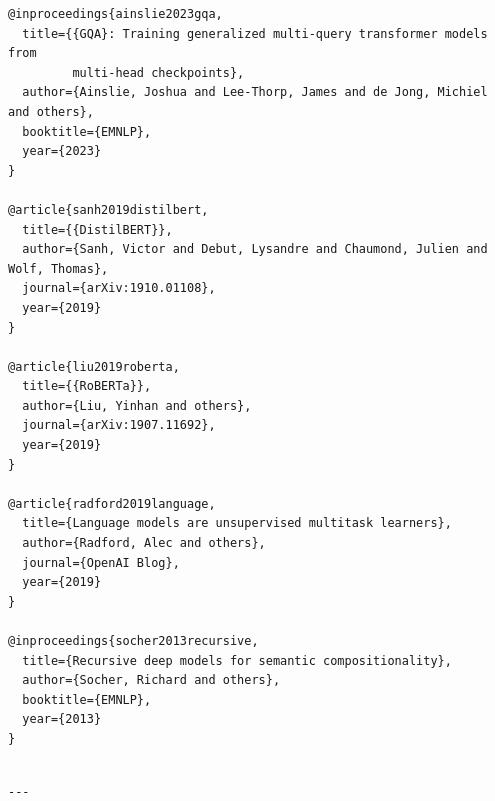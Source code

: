 \begin{lstlisting}
@inproceedings{ainslie2023gqa,
  title={{GQA}: Training generalized multi-query transformer models from 
         multi-head checkpoints},
  author={Ainslie, Joshua and Lee-Thorp, James and de Jong, Michiel and others},
  booktitle={EMNLP},
  year={2023}
}

@article{sanh2019distilbert,
  title={{DistilBERT}},
  author={Sanh, Victor and Debut, Lysandre and Chaumond, Julien and Wolf, Thomas},
  journal={arXiv:1910.01108},
  year={2019}
}

@article{liu2019roberta,
  title={{RoBERTa}},
  author={Liu, Yinhan and others},
  journal={arXiv:1907.11692},
  year={2019}
}

@article{radford2019language,
  title={Language models are unsupervised multitask learners},
  author={Radford, Alec and others},
  journal={OpenAI Blog},
  year={2019}
}

@inproceedings{socher2013recursive,
  title={Recursive deep models for semantic compositionality},
  author={Socher, Richard and others},
  booktitle={EMNLP},
  year={2013}
}
\end{lstlisting}
\begin{lstlisting}

---
\end{lstlisting}